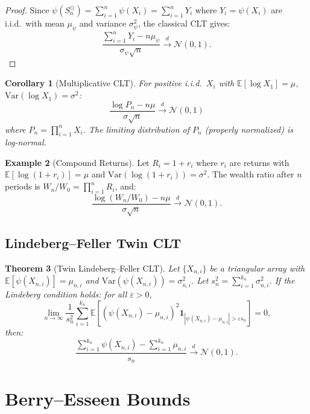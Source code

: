 \documentclass[11pt,twoside,openright]{book}
\theoremstyle{plain}
\newtheorem{theorem}{Theorem}[chapter]
\newtheorem{corollary}[theorem]{Corollary}
\theoremstyle{definition}
\newtheorem{example}[theorem]{Example}
\theoremstyle{remark}
\newcommand{\calN}{\mathcal{N}}
\newcommand{\E}{\mathbb{E}}
\newcommand{\var}{\mathrm{Var}}
\newcommand{\twin}{\odot}
\begin{document}
\begin{proof}
Since $\psi(S_n^{\twin}) = \sum_{i=1}^n \psi(X_i) = \sum_{i=1}^n Y_i$ where $Y_i = \psi(X_i)$ are i.i.d.\ with mean $\mu_\psi$ and variance $\sigma_\psi^2$, the classical CLT gives:
\[
\frac{\sum_{i=1}^n Y_i - n\mu_\psi}{\sigma_\psi\sqrt{n}} \xrightarrow{d} \calN(0,1).
\]
\end{proof}

\begin{corollary}[Multiplicative CLT]
\label{cor:mult-clt}
For positive i.i.d.\ $X_i$ with $\E[\log X_1] = \mu$, $\var(\log X_1) = \sigma^2$:
\begin{equation}
\frac{\log P_n - n\mu}{\sigma\sqrt{n}} \xrightarrow{d} \calN(0,1)
\label{eq:mult-clt}
\end{equation}
where $P_n = \prod_{i=1}^n X_i$. The limiting distribution of $P_n$ (properly normalized) is log-normal.
\end{corollary}

\begin{example}[Compound Returns]
Let $R_i = 1 + r_i$ where $r_i$ are returns with $\E[\log(1+r_i)] = \mu$ and $\var(\log(1+r_i)) = \sigma^2$. The wealth ratio after $n$ periods is $W_n/W_0 = \prod_{i=1}^n R_i$, and:
\[
\frac{\log(W_n/W_0) - n\mu}{\sigma\sqrt{n}} \xrightarrow{d} \calN(0,1).
\]
\end{example}

\subsection{Lindeberg--Feller Twin CLT}

\begin{theorem}[Twin Lindeberg--Feller CLT]
\label{thm:twin-lindeberg}
Let $\{X_{n,i}\}$ be a triangular array with $\E[\psi(X_{n,i})] = \mu_{n,i}$ and $\var(\psi(X_{n,i})) = \sigma_{n,i}^2$. Let $s_n^2 = \sum_{i=1}^{k_n} \sigma_{n,i}^2$. If the Lindeberg condition holds: for all $\varepsilon > 0$,
\[
\lim_{n \to \infty} \frac{1}{s_n^2} \sum_{i=1}^{k_n} \E\left[(\psi(X_{n,i}) - \mu_{n,i})^2 \mathbf{1}_{|\psi(X_{n,i}) - \mu_{n,i}| > \varepsilon s_n}\right] = 0,
\]
then:
\[
\frac{\sum_{i=1}^{k_n} \psi(X_{n,i}) - \sum_{i=1}^{k_n} \mu_{n,i}}{s_n} \xrightarrow{d} \calN(0,1).
\]
\end{theorem}

\section{Berry--Esseen Bounds}
\end{document}
